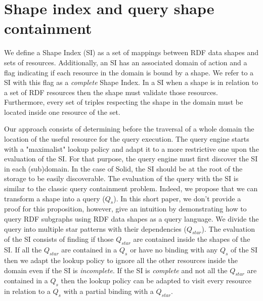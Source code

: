 \section{Shape index and query shape containment}

We define a Shape Index (SI) as a set of mappings between RDF data shapes and sets of resources.
Additionally, an SI has an associated domain of action
and a flag indicating if each resource in the domain is bound by a shape. 
We refer to a SI with this flag as a \emph{complete} Shape Index.
In a SI when a shape is in relation to a set of RDF resources then the shape must validate those resources.
Furthermore, every set of triples respecting the shape in the domain must be located inside one resource of the set.

Our approach consists of determining before the traversal of a whole domain the location of the useful resource for the query execution.
The query engine starts with a "maximalist" lookup policy and adapt it to a more restrictive one upon the evaluation of the SI.
For that purpose, the query engine must first discover the SI in each (sub)domain.
In the case of Solid, the SI should be at the root of the storage to be easily discoverable.
The evaluation of the query with the SI is similar to the classic query containment problem.
Indeed, we propose that we can transform a shape into a query ($Q_{s}$).
In this short paper, we don't provide a proof for this proposition, however, 
\citeauthor{Delva2021} give an intuition by demonstrating how to query RDF subgraphs using RDF data shapes as a query language.
We divide the query into multiple star patterns with their dependencies ($Q_{star}$).
The evaluation of the SI consists of finding if those $Q_{star}$ are contained inside the shapes of the SI.
If all the $Q_{star}$ are contained in a $Q_{s}$ or have no binding with any $Q_{s}$ of the SI
then we adapt the lookup policy to ignore all the other resources inside the domain even if the SI is \emph{incomplete}.
If the SI is \emph{complete} and not all the $Q_{star}$ are contained in a $Q_{s}$ then the lookup policy can be adapted
to visit every resource in relation to a $Q_{s}$ with a partial binding with a $Q_{star}$.
